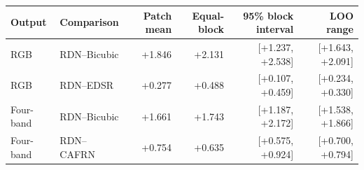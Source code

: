 \begin{tabular}{@{}llrrrr@{}}
\toprule
Output & Comparison & Patch mean & Equal-block & 95\% block interval & LOO range \\
\midrule
RGB & RDN--Bicubic & +1.846 & +2.131 & [+1.237, +2.538] & [+1.643, +2.091] \\
RGB & RDN--EDSR & +0.277 & +0.488 & [+0.107, +0.459] & [+0.234, +0.330] \\
Four-band & RDN--Bicubic & +1.661 & +1.743 & [+1.187, +2.172] & [+1.538, +1.866] \\
Four-band & RDN--CAFRN & +0.754 & +0.635 & [+0.575, +0.924] & [+0.700, +0.794] \\
\bottomrule
\end{tabular}
